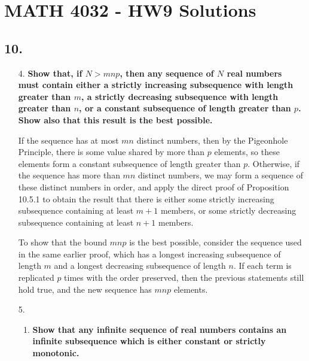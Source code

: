 \documentclass[a4paper,12pt]{article}
\begin{document}
\section*{MATH 4032 - HW9 Solutions}
\subsection*{10.}
\begin{enumerate}
    \iffalse
        \item[2.]
            \boldmath
            \textbf{Show that any finite graph contains two vertices lying on the same number of edges.} \par
            \unboldmath
    \fi

    \item[4.]
        \boldmath
        \textbf{Show that, if $N > mnp$, then any sequence of $N$ real numbers must contain either a strictly increasing subsequence with length greater than $m$, a strictly decreasing subsequence with length greater than $n$, or a constant subsequence of length greater than $p$. Show also that this result is the best possible.} \par
        \unboldmath
        If the sequence has at most $mn$ distinct numbers, then by the Pigeonhole Principle, there is some value shared by more than $p$ elements, so these elements form a constant subsequence of length greater than $p$. Otherwise, if the sequence has more than $mn$ distinct numbers, we may form a sequence of these distinct numbers in order, and apply the direct proof of Proposition 10.5.1 to obtain the result that there is either some strictly increasing subsequence containing at least $m + 1$ members, or some strictly decreasing subsequence containing at least $n + 1$ members. \par
        To show that the bound $mnp$ is the best possible, consider the sequence used in the same earlier proof, which has a longest increasing subsequence of length $m$ and a longest decreasing subsequence of length $n$. If each term is replicated $p$ times with the order preserved, then the previous statements still hold true, and the new sequence has $mnp$ elements.

    \iffalse
    \item[5.]
        \begin{enumerate}
            \item
                \boldmath
                \textbf{Show that any infinite sequence of real numbers contains an infinite subsequence which is either constant or strictly monotonic.} \par
                \unboldmath
        \end{enumerate}


\end{enumerate}
\end{document}
